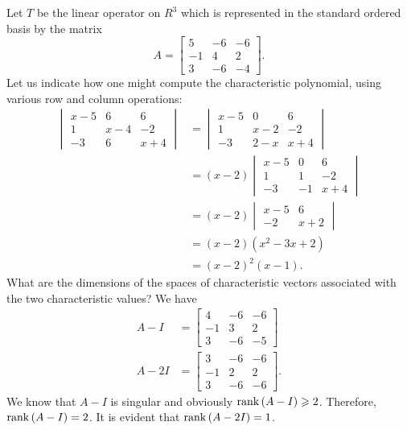 \begin{example}
    Let \(T\) be the linear operator on \(R^3\) which is represented in the standard ordered basis by the matrix
    \begin{equation*}
        A=
        \begin{bmatrix}
            5 & -6 & -6 \\
            -1 & 4 & 2 \\
            3 & -6 & -4
        \end{bmatrix}
        .
    \end{equation*}
    Let us indicate how one might compute the characteristic polynomial, using various row and column operations:
    \begin{align*}
        \begin{vmatrix}
            x-5 & 6 & 6 \\
            1 & x-4 & -2 \\
            -3 & 6 & x+4
        \end{vmatrix}
        &=
        \begin{vmatrix}
            x-5 & 0 & 6 \\
            1 & x-2 & -2 \\
            -3 & 2-x & x+4
        \end{vmatrix}
        \\
        &=\left(x-2\right)
        \begin{vmatrix}
            x-5 & 0 & 6 \\
            1 & 1 & -2 \\
            -3 & -1 & x+4
        \end{vmatrix}
        \\
        &=\left(x-2\right)
        \begin{vmatrix}
            x-5 & 6 \\
            -2 & x+2
        \end{vmatrix}
        \\
        &=\left(x-2\right)\left(x^2-3x+2\right)\\
        &=\left(x-2\right)^2\left(x-1\right).
    \end{align*}
    What are the dimensions of the spaces of characteristic vectors associated with the two characteristic values? We have
    \begin{align*}
        A-I&=
        \begin{bmatrix}
            4 & -6 & -6 \\
            -1 & 3 & 2 \\
            3 & -6 & -5
        \end{bmatrix}
        \\
        A-2I&=
        \begin{bmatrix}
            3 & -6 & -6 \\
            -1 & 2 & 2 \\
            3 & -6 & -6
        \end{bmatrix}
        .
    \end{align*}
    We know that \(A-I\) is singular and obviously \(\operatorname{rank}\left(A-I\right)\geqslant2\). Therefore, \(\operatorname{rank}\left(A-I\right)=2\). It is evident that \(\operatorname{rank}\left(A-2I\right)=1\).


\end{example}
